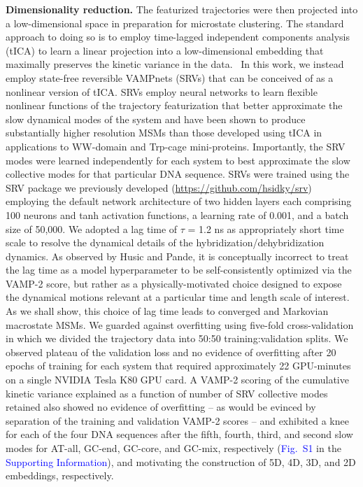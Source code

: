 \documentclass[journal=jpcbfk,manuscript=article]{achemso}
\newcommand*{\blauw}[1]{\textcolor{blue}{#1}}
\begin{document}
\textbf{Dimensionality reduction.} The featurized trajectories were then projected into a low-dimensional space in preparation for microstate clustering. The standard approach to doing so is to employ time-lagged independent components analysis (tICA) to learn a linear projection into a low-dimensional embedding that maximally preserves the kinetic variance in the data.~\citep{Perez-Hernandez2013IdentificationConstruction, Schwantes2013ImprovementsNTL9, Noe2015KineticSimulation} In this work, we instead employ state-free reversible VAMPnets (SRVs) that can be conceived of as a nonlinear version of tICA. \citep{Chen} SRVs employ neural networks to learn flexible nonlinear functions of the trajectory featurization that better approximate the slow dynamical modes of the system and have been shown to produce substantially higher resolution MSMs than those developed using tICA in applications to WW-domain and Trp-cage mini-proteins.\citep{Chen, Sidky} Importantly, the SRV modes were learned independently for each system to best approximate the slow collective modes for that particular DNA sequence. SRVs were trained using the SRV package we previously developed (\url{https://github.com/hsidky/srv}) employing the default network architecture of two hidden layers each comprising 100 neurons and tanh activation functions, a learning rate of 0.001, and a batch size of 50,000. We adopted a lag time of $\tau$ = 1.2 ns as appropriately short time scale to resolve the dynamical details of the hybridization/dehybridization dynamics. \citep{Phys2018MarkovValidation} As observed by Husic and Pande, it is conceptually incorrect to treat the lag time as a model hyperparameter to be self-consistently optimized via the VAMP-2 score, but rather as a physically-motivated choice designed to expose the dynamical motions relevant at a particular time and length scale of interest. \citep{Husic2017Note:Selection} As we shall show, this choice of lag time leads to converged and Markovian macrostate MSMs. We guarded against overfitting using five-fold cross-validation in which we divided the trajectory data into 50:50 training:validation splits. We observed plateau of the validation loss and no evidence of overfitting after 20 epochs of training for each system that required approximately 22 GPU-minutes on a single NVIDIA Tesla K80 GPU card. A VAMP-2 scoring of the cumulative kinetic variance explained as a function of number of SRV collective modes retained also showed no evidence of overfitting -- as would be evinced by separation of the training and validation VAMP-2 scores \citep{Sidky} -- and exhibited a knee for each of the four DNA sequences after the fifth, fourth, third, and second slow modes for AT-all, GC-end, GC-core, and GC-mix, respectively (\blauw{Fig.~S1} in the \blauw{Supporting Information}), and motivating the construction of 5D, 4D, 3D, and 2D embeddings, respectively.
\end{document}
